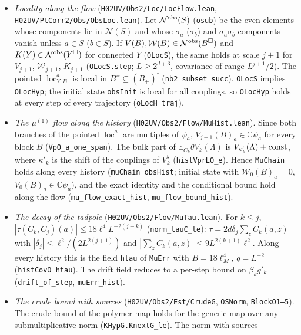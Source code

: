 \documentclass[11pt]{amsart}
\theoremstyle{definition}
\theoremstyle{remark}
\numberwithin{equation}{section}
\newcommand{\E}{\mathbb{E}}
\begin{document}
\begin{itemize}
  $\E_C\theta Z_j=e^{-u_{j+1}(\Lambda)}Z_{j+1}$ with sources (\texttt{stepK\_ZVKO}).
\item \emph{Locality along the flow} (\texttt{H02UV/Obs2/Loc/LocFlow.lean}, \texttt{H02UV/PtCorr2/Obs/ObsLoc.lean}). Let $\mathcal N^{\rm obs}(S)$
  (\texttt{osub}) be the even elements whose components lie in $\mathcal N(S)$ and whose $\sigma_a$ ($\sigma_b$) and
  $\sigma_a\sigma_b$ components vanish unless $a\in S$ ($b\in S$). If $V(B),\mathcal W(B)\in\mathcal N^{\rm obs}(B^\square)$ and
  $K(Y)\in\mathcal N^{\rm obs}(Y^\square)$ for connected $Y$ (\texttt{OLocS}), the same holds at scale $j+1$ for
  $V_{j+1}$, $\mathcal W_{j+1}$, $K_{j+1}$ (\texttt{OLocS.step}; $L\ge2^{d+3}$, covariance of range $L^{j+1}/2$). The
  pointed $\operatorname{loc}^a_{Y,B}$ is local in $B^{\square\square}\subseteq(B_+)^\square$ (\texttt{nb2\_subset\_succ}).
  \texttt{OLocS} implies \texttt{OLocHyp}; the initial state \texttt{obsInit} is local for all couplings, so
  \texttt{OLocHyp} holds at every step of every trajectory (\texttt{oLocH\_traj}).
\item \emph{The $\mu^{(1)}$ flow along the history} (\texttt{H02UV/Obs2/Flow/MuHist.lean}). Since both branches of the pointed
  $\operatorname{loc}^a$ are multiples of $\bar\psi_a$, $V_{j+1}(B)_a\in\mathbb C\bar\psi_a$ for every block $B$
  (\texttt{VpO\_a\_one\_span}). The bulk part of $\E_{C_k}\theta V_k(\Lambda)$ is $V_{\kappa'_k}(\Lambda)+{\rm const}$, where
  $\kappa'_k$ is the shift of the couplings of $V^\flat_k$ (\texttt{histVprLO\_e}). Hence \texttt{MuChain} holds along every
  history (\texttt{muChain\_obsHist}; initial state with $\mathcal W_0(B)_a=0$, $V_0(B)_a\in\mathbb C\bar\psi_a$), and the exact
  identity and the conditional bound hold along the flow (\texttt{mu\_flow\_exact\_hist}, \texttt{mu\_flow\_bound\_hist}).
\item \emph{The decay of the tadpole} (\texttt{H02UV/Obs2/Flow/MuTau.lean}). For $k\le j$,
  $|\tau(C_k,C_j)(a)|\le18\ell^4L^{-2(j-k)}$ (\texttt{norm\_tauC\_le}): $\tau=2d\delta_j\sum_zC_k(a,z)$ with
  $|\delta_j|\le\ell^2/(2L^{2(j+1)})$ and $|\sum_zC_k(a,z)|\le9L^{2(k+1)}\ell^2$. Along every history this is the field
  \texttt{htau} of \texttt{MuErr} with $B=18\ell_M^4$, $q=L^{-2}$ (\texttt{histCovO\_htau}). The drift field reduces to a
  per-step bound on $\beta_kg'_k$ (\texttt{drift\_of\_step}, \texttt{muErr\_hist}).
\item \emph{The crude bound with sources} (\texttt{H02UV/Obs2/Est/CrudeG}, \texttt{OSNorm}, \texttt{BlockO1--5}). The crude bound of the
  polymer map holds for the generic map over any submultiplicative norm (\texttt{KHypG.KnextG\_le}). The norm with sources

\end{itemize}
\end{document}
